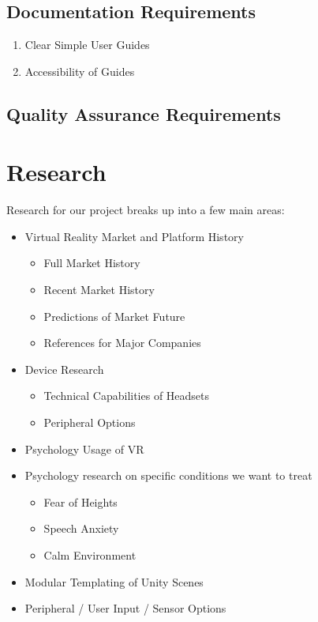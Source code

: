 \documentclass[a4paper,10pt,twoside]{article}
\begin{document}
	\subsection{Documentation Requirements}
	\begin{enumerate}
	\item Clear Simple User Guides
	\item Accessibility of Guides
	\end{enumerate}
	\subsection{Quality Assurance Requirements}

	
	
\pagebreak
\section{Research}
Research for our project breaks up into a few main areas:
\begin{itemize}
\item Virtual Reality Market and Platform History
	\begin{itemize}
	\item Full Market History
	\item Recent Market History
	\item Predictions of Market Future
	\item References for Major Companies
	\end{itemize}
\item Device Research
	\begin{itemize}
	\item Technical Capabilities of Headsets
	\item Peripheral Options
	\end{itemize}
\item Psychology Usage of VR
\item Psychology research on specific conditions we want to treat
	\begin{itemize}
	\item Fear of Heights
	\item Speech Anxiety
	\item Calm Environment
	\end{itemize}
\item Modular Templating of Unity Scenes
\item Peripheral / User Input / Sensor Options
\end{itemize}
\pagebreak
\end{document}
